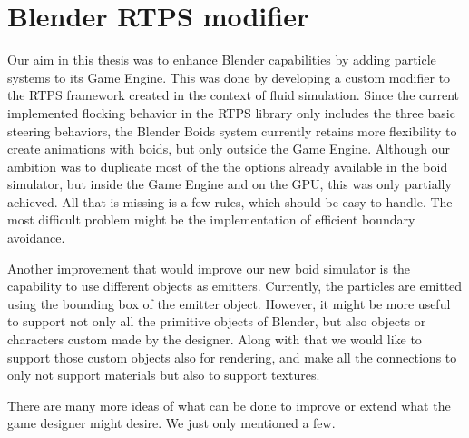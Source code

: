 \section{Blender RTPS modifier}
Our aim in this thesis was to enhance Blender capabilities by adding particle systems to its Game Engine. This was done by developing a custom modifier to the RTPS framework created in the context of fluid simulation. Since the current implemented flocking behavior in the RTPS library only includes the three basic steering behaviors, the Blender Boids system currently retains more flexibility to create animations with boids, but only outside the Game Engine.  Although our ambition was to duplicate most of the the options already available in the boid simulator, but inside the Game Engine and on the GPU, this was only partially achieved. All that is missing is a few rules, which should be easy to handle. The most difficult problem might be the implementation of efficient  boundary avoidance. 

Another improvement that would improve our new boid simulator is the capability to use different objects as emitters. Currently, the particles are emitted using the bounding box of the emitter object. However, it might be more useful to support not only all the primitive objects of Blender, but also objects or characters custom made by the designer. Along with that we would like to support those custom objects also for rendering, and make all the connections to only not support materials but also to support textures.

There are many more ideas of what can be done to improve or extend what the game designer might desire. We just only mentioned a few.

